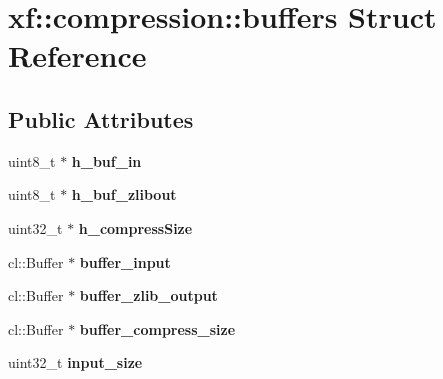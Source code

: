 \hypertarget{structxf_1_1compression_1_1buffers}{\section{xf\-:\-:compression\-:\-:buffers Struct Reference}
\label{structxf_1_1compression_1_1buffers}
}
\subsection*{Public Attributes}
\begin{DoxyCompactItemize}
\item 
\hypertarget{structxf_1_1compression_1_1buffers_a7ea25c35afd613391b3b61631dbb6674}{uint8\-\_\-t $\ast$ {\bfseries h\-\_\-buf\-\_\-in}}\label{structxf_1_1compression_1_1buffers_a7ea25c35afd613391b3b61631dbb6674}

\item 
\hypertarget{structxf_1_1compression_1_1buffers_a83e27807381db1d7724b15a882f24029}{uint8\-\_\-t $\ast$ {\bfseries h\-\_\-buf\-\_\-zlibout}}\label{structxf_1_1compression_1_1buffers_a83e27807381db1d7724b15a882f24029}

\item 
\hypertarget{structxf_1_1compression_1_1buffers_a1d868ed92a6977a82855088059db56d9}{uint32\-\_\-t $\ast$ {\bfseries h\-\_\-compress\-Size}}\label{structxf_1_1compression_1_1buffers_a1d868ed92a6977a82855088059db56d9}

\item 
\hypertarget{structxf_1_1compression_1_1buffers_a80d76bbf20b504dd22459649f9f067e4}{cl\-::\-Buffer $\ast$ {\bfseries buffer\-\_\-input}}\label{structxf_1_1compression_1_1buffers_a80d76bbf20b504dd22459649f9f067e4}

\item 
\hypertarget{structxf_1_1compression_1_1buffers_a6bdf1f1668be3348a6c873cab5397991}{cl\-::\-Buffer $\ast$ {\bfseries buffer\-\_\-zlib\-\_\-output}}\label{structxf_1_1compression_1_1buffers_a6bdf1f1668be3348a6c873cab5397991}

\item 
\hypertarget{structxf_1_1compression_1_1buffers_a2cbd05777fa99cdd3f8b6b7065175b37}{cl\-::\-Buffer $\ast$ {\bfseries buffer\-\_\-compress\-\_\-size}}\label{structxf_1_1compression_1_1buffers_a2cbd05777fa99cdd3f8b6b7065175b37}

\item 
\hypertarget{structxf_1_1compression_1_1buffers_a1861ace8053ed2c13ab89ea2930ba6d7}{uint32\-\_\-t {\bfseries input\-\_\-size}}\label{structxf_1_1compression_1_1buffers_a1861ace8053ed2c13ab89ea2930ba6d7}


\end{DoxyCompactItemize}
